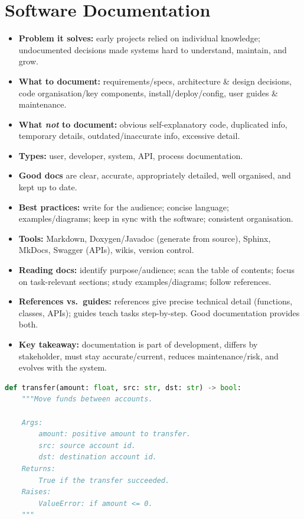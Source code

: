 \documentclass[hidelinks]{article}
\begin{document}
\section{Software Documentation}
\begin{itemize}
  \item \textbf{Problem it solves:} early projects relied on individual knowledge; undocumented
        decisions made systems hard to understand, maintain, and grow.
  \item \textbf{What to document:} requirements/specs, architecture \& design decisions, code
        organisation/key components, install/deploy/config, user guides \& maintenance.
  \item \textbf{What \emph{not} to document:} obvious self-explanatory code, duplicated info,
        temporary details, outdated/inaccurate info, excessive detail.
  \item \textbf{Types:} user, developer, system, API, process documentation.
  \item \textbf{Good docs} are clear, accurate, appropriately detailed, well organised, and kept
        up to date.
  \item \textbf{Best practices:} write for the audience; concise language; examples/diagrams; keep
        in sync with the software; consistent organisation.
  \item \textbf{Tools:} Markdown, Doxygen/Javadoc (generate from source), Sphinx, MkDocs, Swagger
        (APIs), wikis, version control.
  \item \textbf{Reading docs:} identify purpose/audience; scan the table of contents; focus on
        task-relevant sections; study examples/diagrams; follow references.
  \item \textbf{References vs.\ guides:} references give precise technical detail (functions,
        classes, APIs); guides teach tasks step-by-step. Good documentation provides both.
  \item \textbf{Key takeaway:} documentation is part of development, differs by stakeholder, must
        stay accurate/current, reduces maintenance/risk, and evolves with the system.
\end{itemize}

\begin{lstlisting}[language=Python,caption={Docstring that Sphinx/IDEs can render (added)}]
def transfer(amount: float, src: str, dst: str) -> bool:
    """Move funds between accounts.

    Args:
        amount: positive amount to transfer.
        src: source account id.
        dst: destination account id.
    Returns:
        True if the transfer succeeded.
    Raises:
        ValueError: if amount <= 0.
    """
\end{lstlisting}
\end{document}
